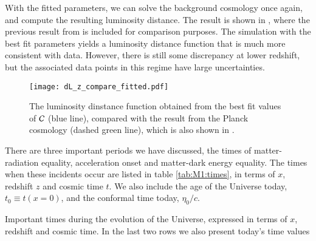 With the fitted parameters, we can solve the background cosmology once again, and compute the resulting luminosity distance. The result is shown in , where the previous result from  is included for comparison purposes. The simulation with the best fit parameters yields a luminosity distance function that is much more consistent with data. However, there is still some discrepancy at lower redshift, but the associated data points in this regime have large uncertainties.    
\begin{figure}[ht!]
    \texttt{[image: dL\_z\_compare\_fitted.pdf]}
    \caption{The luminosity dinstance function obtained from the best fit values of $\mathcal{C}$ (blue line), compared with the result from the Planck cosmology (dashed green line), which is also shown in .}
    \label{fig:M1:dL_of_z_data_vs_bestfit}
\end{figure}


There are three important periods we have discussed, the times of matter-radiation equality, acceleration onset and matter-dark energy equality. The times when these incidents occur are listed in table \ref{tab:M1:times}, in terms of $x$, redshift $z$ and cosmic time $t$. We also include the age of the Universe today, $t_0\equiv t(x=0)$, and the conformal time today, $\eta_0/c$. 
\begin{table*}[ht!]
    \raggedright
    
    \label{tab:M1:times}
    \caption{Important times during the evolution of the Universe, expressed in terms of $x$, redshift and cosmic time. In the last two rows we also present today's time values}
\end{table*}